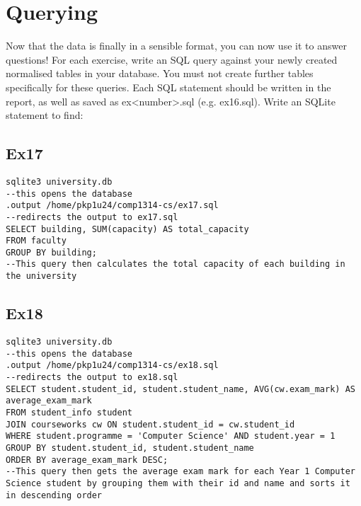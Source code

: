 \documentclass[12pt]{article}
\begin{document}
{{\section{Querying}
Now that the data is finally in a sensible format, you can now use it to answer questions! For each exercise, write an SQL query against your newly created normalised tables in your database. You must not create further tables specifically for these queries. Each SQL statement should be written in the report, as well as saved as ex<number>.sql (e.g. ex16.sql). Write an SQLite statement to find:
\subsection{Ex17}
\begin{tcolorbox}[
    enhanced,
    attach boxed title to top left={xshift=6mm,yshift=-3mm},
    colback=lightgreen!20,
    colframe=lightgreen,
    colbacktitle=lightgreen,
    title=Linux shell,
    fonttitle=\bfseries\color{black},
    boxed title style={size=small,colframe=lightgreen,sharp corners},
    sharp corners,
]
\begin{verbatim}
sqlite3 university.db 
--this opens the database
.output /home/pkp1u24/comp1314-cs/ex17.sql
--redirects the output to ex17.sql
SELECT building, SUM(capacity) AS total_capacity
FROM faculty
GROUP BY building;
--This query then calculates the total capacity of each building in the university
\end{verbatim}
\end{tcolorbox}
\subsection{Ex18}
\begin{tcolorbox}[
    enhanced,
    attach boxed title to top left={xshift=6mm,yshift=-3mm},
    colback=lightgreen!20,
    colframe=lightgreen,
    colbacktitle=lightgreen,
    title=Linux shell,
    fonttitle=\bfseries\color{black},
    boxed title style={size=small,colframe=lightgreen,sharp corners},
    sharp corners,
]
\begin{verbatim}
sqlite3 university.db 
--this opens the database
.output /home/pkp1u24/comp1314-cs/ex18.sql
--redirects the output to ex18.sql
SELECT student.student_id, student.student_name, AVG(cw.exam_mark) AS average_exam_mark
FROM student_info student
JOIN courseworks cw ON student.student_id = cw.student_id
WHERE student.programme = 'Computer Science' AND student.year = 1
GROUP BY student.student_id, student.student_name
ORDER BY average_exam_mark DESC;
--This query then gets the average exam mark for each Year 1 Computer Science student by grouping them with their id and name and sorts it in descending order
\end{verbatim}
\end{tcolorbox}
}}
\end{document}
